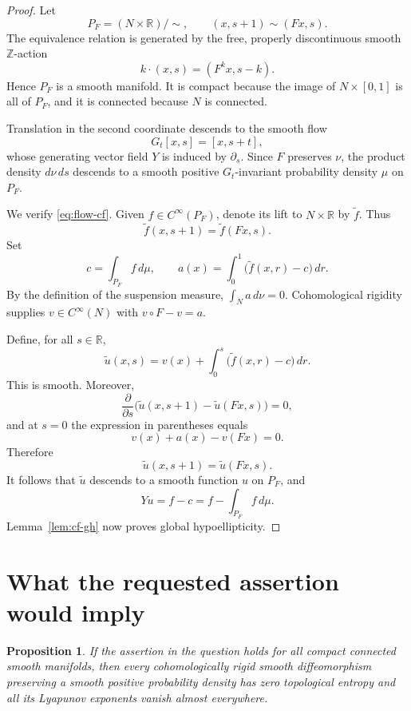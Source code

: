 \documentclass[11pt]{article}
\newtheorem{proposition}[lemma]{Proposition}
\theoremstyle{definition}
\theoremstyle{remark}
\newcommand{\R}{\mathbb{R}}
\begin{document}
\begin{proof}
Let
\[
 P_F=(N\times\R)/{\sim},
 \qquad
 (x,s+1)\sim(Fx,s).
\]
The equivalence relation is generated by the free, properly
discontinuous smooth $\mathbb Z$-action
\[
 k\cdot(x,s)=(F^k x,s-k).
\]
Hence $P_F$ is a smooth manifold. It is compact because the image of
$N\times[0,1]$ is all of $P_F$, and it is connected because $N$ is
connected.

Translation in the second coordinate descends to the smooth flow
\[
 G_t[x,s]=[x,s+t],
\]
whose generating vector field $Y$ is induced by $\partial_s$.
Since $F$ preserves $\nu$, the product density $d\nu\,ds$ descends to
a smooth positive $G_t$-invariant probability density $\mu$ on $P_F$.

We verify \eqref{eq:flow-cf}. Given $f\in C^\infty(P_F)$, denote its
lift to $N\times\R$ by $\widetilde f$. Thus
\[
 \widetilde f(x,s+1)=\widetilde f(Fx,s).
\]
Set
\[
 c=\int_{P_F}f\,d\mu,
 \qquad
 a(x)=\int_0^1\bigl(\widetilde f(x,r)-c\bigr)\,dr.
\]
By the definition of the suspension measure,
$\int_N a\,d\nu=0$. Cohomological rigidity supplies
$v\in C^\infty(N)$ with $v\circ F-v=a$.

Define, for all $s\in\R$,
\[
 \widetilde u(x,s)
 =
 v(x)+\int_0^s\bigl(\widetilde f(x,r)-c\bigr)\,dr.
\]
This is smooth. Moreover,
\[
 \frac{\partial}{\partial s}
 \bigl(\widetilde u(x,s+1)-\widetilde u(Fx,s)\bigr)=0,
\]
and at $s=0$ the expression in parentheses equals
\[
 v(x)+a(x)-v(Fx)=0.
\]
Therefore
\[
 \widetilde u(x,s+1)=\widetilde u(Fx,s).
\]
It follows that $\widetilde u$ descends to a smooth function $u$ on
$P_F$, and
\[
 Yu=f-c=f-\int_{P_F}f\,d\mu.
\]
Lemma~\ref{lem:cf-gh} now proves global hypoellipticity.
\end{proof}

\section{What the requested assertion would imply}

\begin{proposition}\label{prop:reduction}
If the assertion in the question holds for all compact connected smooth
manifolds, then every cohomologically rigid smooth diffeomorphism
preserving a smooth positive probability density has zero topological
entropy and all its Lyapunov exponents vanish almost everywhere.
\end{proposition}

\end{document}
